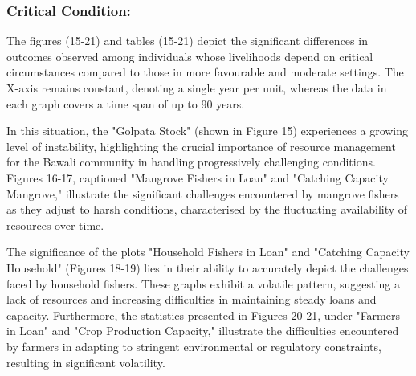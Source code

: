 \documentclass[final,5p,times,twocolumn,authoryear]{elsarticle}
\begin{document}
\subsubsection{Critical Condition:}
\vspace{0.5cm}
The figures (15-21) and tables (15-21) depict the significant differences in outcomes observed among individuals whose livelihoods depend on critical circumstances compared to those in more favourable and moderate settings. The X-axis remains constant, denoting a single year per unit, whereas the data in each graph covers a time span of up to 90 years.

In this situation, the "Golpata Stock" (shown in Figure 15) experiences a growing level of instability, highlighting the crucial importance of resource management for the Bawali community in handling progressively challenging conditions. Figures 16-17, captioned "Mangrove Fishers in Loan" and "Catching Capacity Mangrove," illustrate the significant challenges encountered by mangrove fishers as they adjust to harsh conditions, characterised by the fluctuating availability of resources over time.

The significance of the plots "Household Fishers in Loan" and "Catching Capacity Household" (Figures 18-19) lies in their ability to accurately depict the challenges faced by household fishers. These graphs exhibit a volatile pattern, suggesting a lack of resources and increasing difficulties in maintaining steady loans and capacity. Furthermore, the statistics presented in Figures 20-21, under "Farmers in Loan" and "Crop Production Capacity," illustrate the difficulties encountered by farmers in adapting to stringent environmental or regulatory constraints, resulting in significant volatility.
\end{document}

